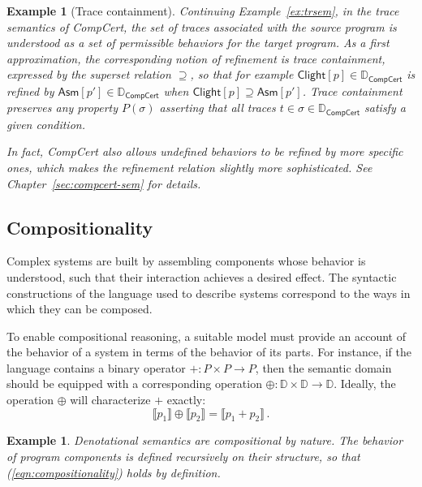 \documentclass[11pt,oneside]{book}
\newtheorem{example}[theorem]{Example}
\theoremstyle{definition}
\newcommand{\kw}[1]{\ensuremath{ \mathsf{#1} }}
\begin{document}
\begin{example}[Trace containment] %
Continuing Example~\ref{ex:trsem},
in the trace semantics of CompCert,
the set of traces associated with the source program
is understood as a set of \emph{permissible} behaviors
for the target program.
As a first approximation,
the corresponding notion of refinement is
\emph{trace containment},
expressed by the superset relation $\supseteq$,
so that for example
$\kw{Clight}[p] \in \mathbb{D}_\kw{CompCert}$
is refined by
$\kw{Asm}[p'] \in \mathbb{D}_\kw{CompCert}$
when
$
  \kw{Clight}[p] \supseteq \kw{Asm}[p']
$.
Trace containment preserves
any property $P(\sigma)$
asserting that \emph{all} traces
$t \in \sigma \in \mathbb{D}_\kw{CompCert}$
satisfy a given condition.

In fact,
CompCert also allows undefined behaviors
to be refined by more specific ones,
which makes the refinement relation
slightly more sophisticated.
See Chapter~\ref{sec:compcert-sem} for details.
\end{example}


\subsection{Compositionality} %

Complex systems are built by assembling components
whose behavior is understood,
such that their interaction achieves a desired effect.
The syntactic constructions of
the language used to describe systems
correspond to the ways in which they can be composed.

To enable compositional reasoning,
a suitable model must provide an account of
the behavior of a system
in terms of the behavior of its parts.
For instance,
if the language contains a binary operator
${+} : P \times P \rightarrow P$,
then the semantic domain should be equipped with
a corresponding operation
${\oplus} : \mathbb{D} \times \mathbb{D} \rightarrow \mathbb{D}$.
Ideally,
the operation $\oplus$
will characterize $+$ exactly:
\begin{equation}
  \llbracket p_1 \rrbracket \oplus \llbracket p_2 \rrbracket
  =
  \llbracket p_1 + p_2 \rrbracket
  \,.
  \label{eqn:compositionality}
\end{equation}

\begin{example}
Denotational semantics are compositional by nature.
The behavior of program components
is defined recursively on their structure,
so that (\ref{eqn:compositionality}) holds \emph{by definition}.
\end{example}
\end{document}
